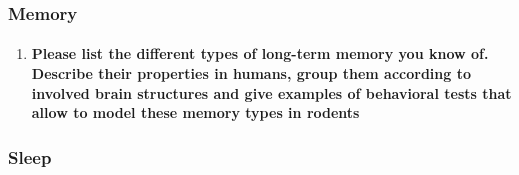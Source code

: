 \documentclass[12pt,article,oneside,a4paper]{memoir}
\begin{document}
\subsubsection{Memory}
\begin{enumerate}
\item \paragraph{Please list the different types of long-term memory you know of. Describe their properties in humans, group them according to involved brain structures and give examples of behavioral tests that allow to model these memory types in rodents}
\end{enumerate}

\subsubsection{Sleep}
\end{document}
